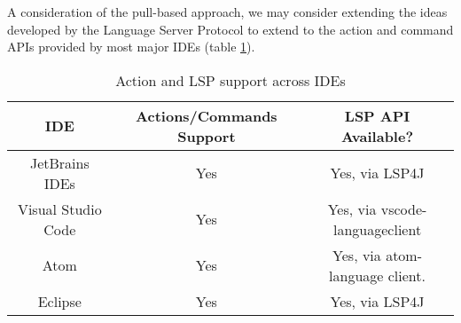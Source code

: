 A consideration of the pull-based approach, we may consider extending the ideas developed by the Language Server Protocol to extend to the action and command APIs provided by most major IDEs (table \ref{table:1}).

\begin{table}[h!]
	\centering
	\begin{tabular}{ | c | c | c |}
		\hline
		IDE & Actions/Commands Support & LSP API Available?\\
		\hline
		\hline
		JetBrains IDEs & Yes & Yes, via LSP4J\\ 
		Visual Studio Code & Yes & Yes, via vscode-languageclient \\
		Atom & Yes & Yes, via atom-language client.\\
		Eclipse & Yes & Yes, via LSP4J\\
		\hline
	\end{tabular}
	\caption{Action and LSP support across IDEs}
	\label{table:1}
\end{table}
